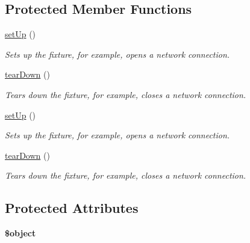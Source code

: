 \subsection*{Protected Member Functions}
\begin{DoxyCompactItemize}
\item 
\hyperlink{class_data_store_test_af4dc9f5bab251425c0cae8db58489d81}{setUp} ()
\begin{DoxyCompactList}\small\item\em Sets up the fixture, for example, opens a network connection. \item\end{DoxyCompactList}\item 
\hyperlink{class_data_store_test_a1fdd376d5a7a4b56af9fa7c7183f9a8c}{tearDown} ()
\begin{DoxyCompactList}\small\item\em Tears down the fixture, for example, closes a network connection. \item\end{DoxyCompactList}\item 
\hyperlink{class_data_store_test_af4dc9f5bab251425c0cae8db58489d81}{setUp} ()
\begin{DoxyCompactList}\small\item\em Sets up the fixture, for example, opens a network connection. \item\end{DoxyCompactList}\item 
\hyperlink{class_data_store_test_a1fdd376d5a7a4b56af9fa7c7183f9a8c}{tearDown} ()
\begin{DoxyCompactList}\small\item\em Tears down the fixture, for example, closes a network connection. \item\end{DoxyCompactList}\end{DoxyCompactItemize}
\subsection*{Protected Attributes}
\begin{DoxyCompactItemize}
\item 
\hypertarget{class_data_store_test_a141032537f87d665cc9074ec773f84f7}{
{\bfseries \$object}}
\label{class_data_store_test_a141032537f87d665cc9074ec773f84f7}

\end{DoxyCompactItemize}


